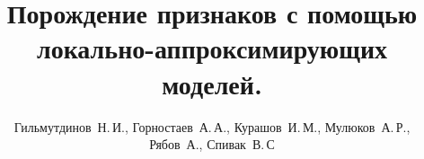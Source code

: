 \documentclass[12pt,twoside]{article}
\title
    [Порождение признаков с помощью локально-аппроксимирующих моделей.]
    {Порождение признаков с помощью локально-аппроксимирующих моделей.}
\author
    [Курашов~И.\,М.]
    {Гильмутдинов~Н.\,И., Горностаев~А.\,А., Курашов~И.\,М., Мулюков~А.\,Р., Рябов~А., Спивак~В.\,С}
\begin{document}
\maketitle
\bigskip
\bigskip
\bigskip
\bigskip
\bigskip
\maketitleSecondary
\end{document}
